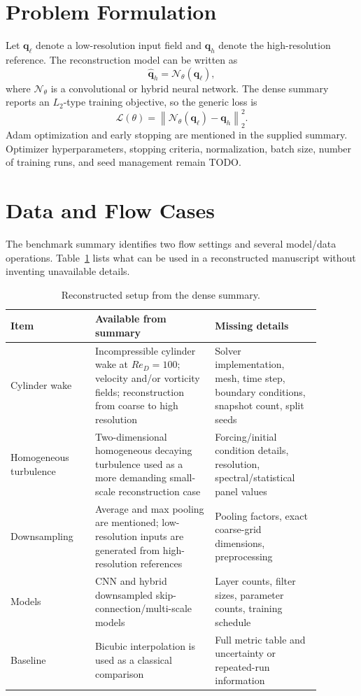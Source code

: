 \documentclass[11pt]{article}
\begin{document}
\section{Problem Formulation}
Let $\mathbf{q}_{\ell}$ denote a low-resolution input field and $\mathbf{q}_{h}$ denote the high-resolution reference. The reconstruction model can be written as
\begin{equation}
  \hat{\mathbf{q}}_{h} = \mathcal{N}_{\theta}(\mathbf{q}_{\ell}),
\end{equation}
where $\mathcal{N}_{\theta}$ is a convolutional or hybrid neural network. The dense summary reports an $L_2$-type training objective, so the generic loss is
\begin{equation}
  \mathcal{L}(\theta) = \left\|\mathcal{N}_{\theta}(\mathbf{q}_{\ell}) - \mathbf{q}_{h}\right\|_2^2.
\end{equation}
Adam optimization and early stopping are mentioned in the supplied summary. Optimizer hyperparameters, stopping criteria, normalization, batch size, number of training runs, and seed management remain TODO.

\section{Data and Flow Cases}
The benchmark summary identifies two flow settings and several model/data operations. Table~\ref{tab:cases} lists what can be used in a reconstructed manuscript without inventing unavailable details.

\begin{table}[h]
\centering
\small
\begin{tabular}{p{0.24\linewidth}p{0.34\linewidth}p{0.30\linewidth}}
\toprule
Item & Available from summary & Missing details \\
\midrule
Cylinder wake & Incompressible cylinder wake at $Re_D=100$; velocity and/or vorticity fields; reconstruction from coarse to high resolution & Solver implementation, mesh, time step, boundary conditions, snapshot count, split seeds \\
Homogeneous turbulence & Two-dimensional homogeneous decaying turbulence used as a more demanding small-scale reconstruction case & Forcing/initial condition details, resolution, spectral/statistical panel values \\
Downsampling & Average and max pooling are mentioned; low-resolution inputs are generated from high-resolution references & Pooling factors, exact coarse-grid dimensions, preprocessing \\
Models & CNN and hybrid downsampled skip-connection/multi-scale models & Layer counts, filter sizes, parameter counts, training schedule \\
Baseline & Bicubic interpolation is used as a classical comparison & Full metric table and uncertainty or repeated-run information \\
\bottomrule
\end{tabular}
\caption{Reconstructed setup from the dense summary.}
\label{tab:cases}
\end{table}
\end{document}

